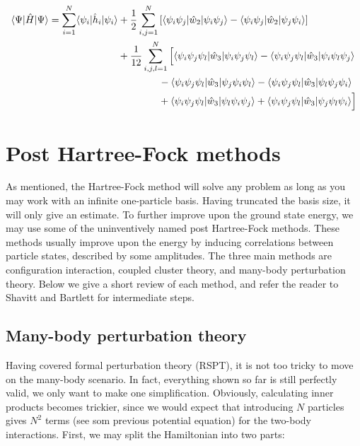 \documentclass[10pt]{report}
\begin{document}
	\begin{align}
		\begin{split}
		\langle\Psi|\hat{H}|\Psi\rangle = \sum_{i=1}^N \langle\psi_i|\hat{h}_i|\psi_i\rangle &+ \frac{1}{2}\sum_{i,j=1}^N \left[\langle\psi_i\psi_j|\hat{w}_2|\psi_i\psi_j\rangle - \langle\psi_i\psi_j|\hat{w}_2|\psi_j\psi_i\rangle\right]\\
		&+ \frac{1}{12}\sum_{i,j,l=1}^N \Big[\langle\psi_i\psi_j\psi_l|\hat{w}_3|\psi_i\psi_j\psi_l\rangle - \langle\psi_i\psi_j\psi_l|\hat{w}_3|\psi_i\psi_l\psi_j\rangle\\
		&\hspace{1.45cm} - \langle\psi_i\psi_j\psi_l|\hat{w}_3|\psi_j\psi_i\psi_l\rangle - \langle\psi_i\psi_j\psi_l|\hat{w}_3|\psi_l\psi_j\psi_i\rangle\\
		&\hspace{1.44cm} + \langle\psi_i\psi_j\psi_l|\hat{w}_3|\psi_l\psi_i\psi_j\rangle + \langle\psi_i\psi_j\psi_l|\hat{w}_3|\psi_j\psi_l\psi_i\rangle\Big]
		\end{split}
	\end{align}
	
	\section{Post Hartree-Fock methods}
	As mentioned, the Hartree-Fock method will solve any problem as long as you may work with an infinite one-particle basis. Having truncated the basis size, it will only give an estimate. To further improve upon the ground state energy, we may use some of the uninventively named post Hartree-Fock methods. These methods usually improve upon the energy by inducing correlations between particle states, described by some amplitudes. The three main methods are configuration interaction, coupled cluster theory, and many-body perturbation theory. Below we give a short review of each method, and refer the reader to Shavitt and Bartlett for intermediate steps.
	
	\subsection{Many-body perturbation theory}
	Having covered formal perturbation theory (RSPT), it is not too tricky to move on the many-body scenario. In fact, everything shown so far is still perfectly valid, we only want to make one simplification. Obviously, calculating inner products becomes trickier, since we would expect that introducing $N$ particles gives $N^2$ terms (see som previous potential equation) for the two-body interactions. First, we may split the Hamiltonian into two parts:
	
\end{document}
